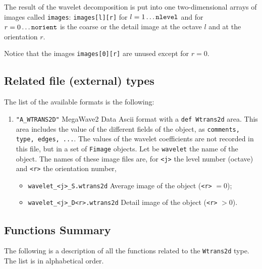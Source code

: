 The result of the wavelet decomposition is put into one two-dimensional arrays of images called \verb+images+:
\verb+images[l][r]+ for $l=1 \ldots \mbox{{\tt nlevel}}$ and for
$r=0 \ldots \mbox{{\tt norient}}$ is the coarse or the detail image at the octave $l$ and at the orientation $r$.

Notice that the images \verb+images[0][r]+ are unused except for $r=0$.

\subsection{Related file (external) types}
\label{wavelets_wtrans2d-file_type}

The list of the available formats is the following:
\begin{enumerate}
\item \verb+"A_WTRANS2D"+ MegaWave2 Data Ascii format with a \verb+def Wtrans2d+ area.
This area includes the value of the different fields of the object, as
\verb+comments, type, edges, ...+. 
The values of the wavelet coefficients are not recorded in this file, but in 
a set of \verb+Fimage+ objects.
Let be \verb+wavelet+ the name of the object. 
The names of these image files are, for \verb+<j>+ the level number (octave)
and \verb+<r>+ the orientation number,
\begin{itemize} 
\item \verb+wavelet_<j>_S.wtrans2d+ Average image of the object (\verb+<r>+ $= 0$);
\item \verb+wavelet_<j>_D<r>.wtrans2d+ Detail image of the object (\verb+<r>+ $> 0$).
\end{itemize}
\end{enumerate}

\subsection{Functions Summary}
\label{wavelets_wtrans2d_function}

The following is a description of all the functions related to 
the \verb+Wtrans2d+ type. The list is in alphabetical order.

\newpage %



